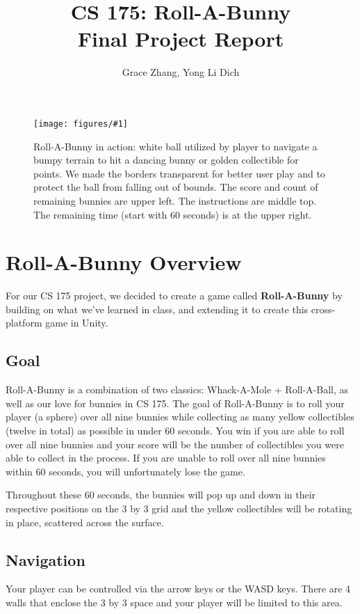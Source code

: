 \documentclass[12pt]{article}
\newcommand{\fig}[3]{\begin{figure}[!ht]
\begin{center}
\texttt{[image: figures/\#1]}
\caption{#2}
\label{#1}
\end{center}
\end{figure}}
\begin{document}
\title{%
  \textbf{CS 175: Roll-A-Bunny \\
  \large Final Project Report}}
\author{Grace Zhang, Yong Li Dich}
\date{}
\maketitle

\newpage
\tableofcontents

\fig{screenshotpic}{Roll-A-Bunny in action: white ball utilized by player to navigate a bumpy terrain to hit a dancing bunny or golden collectible for points. We made the borders transparent for better user play and to protect the ball from falling out of bounds. The score and count of remaining bunnies are upper left. The instructions are middle top. The remaining time (start with 60 seconds) is at the upper right. }

\newpage
 
\section{Roll-A-Bunny Overview}
  For our CS 175 project, we decided to create a game called \textbf{Roll-A-Bunny} by building on what we've learned in class, and extending it to create this cross-platform game in Unity.
\subsection{Goal}
  Roll-A-Bunny is a combination of two classics: Whack-A-Mole + Roll-A-Ball, as well as our love for bunnies in CS 175. The goal of Roll-A-Bunny is to roll your player (a sphere) over all nine bunnies while collecting as many yellow collectibles (twelve in total) as possible in under 60 seconds. 
  You win if you are able to roll over all nine bunnies and your score will be the number of collectibles you were able to collect in the process. If you are unable to roll over all nine bunnies within 60 seconds, you will unfortunately lose the game.

  Throughout these 60 seconds, the bunnies will pop up and down in their respective positions on the 3 by 3 grid and the yellow collectibles will be rotating in place, scattered across the surface. 
  
\subsection{Navigation}
  Your player can be controlled via the arrow keys or the WASD keys. 
  There are 4 walls that enclose the 3 by 3 space and your player will be limited to this area. 
\end{document}
